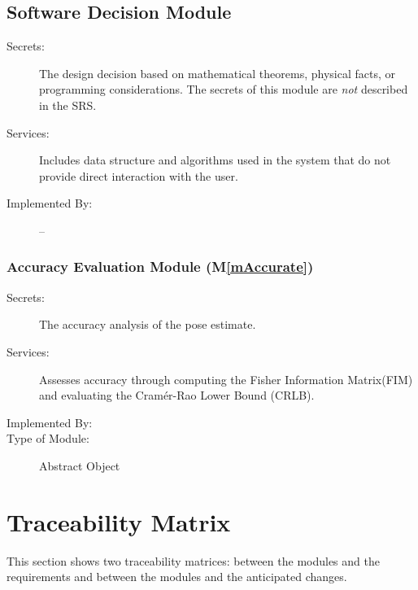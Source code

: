 \documentclass[12pt, titlepage]{article}
\newcommand{\mref}[1]{M\ref{#1}}
\begin{document}


\subsection{Software Decision Module}

\begin{description}
\item[Secrets:] The design decision based on mathematical theorems, physical
  facts, or programming considerations. The secrets of this module are
  \emph{not} described in the SRS.
\item[Services:] Includes data structure and algorithms used in the system that
  do not provide direct interaction with the user. 
\item[Implemented By:] --
\end{description}


\subsubsection{Accuracy Evaluation Module (\mref{mAccurate})}

\begin{description}
\item[Secrets:]The accuracy analysis of the pose estimate.
\item[Services:]Assesses accuracy through computing the Fisher Information Matrix(FIM) and evaluating the Cram\'{e}r-Rao Lower Bound (CRLB).
\item[Implemented By:] \progname
\item[Type of Module:] Abstract Object
\end{description}



\section{Traceability Matrix} \label{SecTM}

This section shows two traceability matrices: between the modules and the
requirements and between the modules and the anticipated changes.
\end{document}
